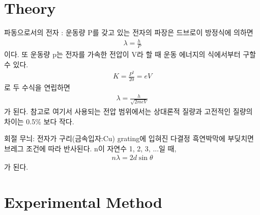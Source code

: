 \documentclass[a4paper, 10pt, nanum]{CSUniSchoolLabReport}
\begin{document}

\section{Theory}


	파동으로서의 전자 : 운동량 P를 갖고 있는 전자의 파장은 드브로이 방정식에 의하면
	\begin{align}
		\lambda = \frac{h}{P}
	\end{align}
	이다. 또 운동량 p는 전자를 가속한 전압이 V라 할 때 운동 에너지의 식에서부터 구할 수 있다.
	\begin{align}
		K = \frac{P^2}{20} = eV
	\end{align}
	로 두 수식을 연립하면
	\begin{align}
		\lambda = \frac{h}{\sqrt{2meV}}
	\end{align}
	가 된다. 참고로 여기서 사용되는 전압 범위에서는 상대론적 질량과 고전적인 질량의 차이는 0.5\% 보다 작다.

	회절 무늬: 전자가 구리(금속입자:Cu) grating에 입혀진 다결정 흑연박막에 부딪치면 브레그 조건에 따라 반사된다. n이 자연수 1, 2, 3, ...일 때,
	\begin{align}
		n\lambda = 2d \sin\theta
	\end{align}
	가 된다.



\section{Experimental Method}
\end{document}
